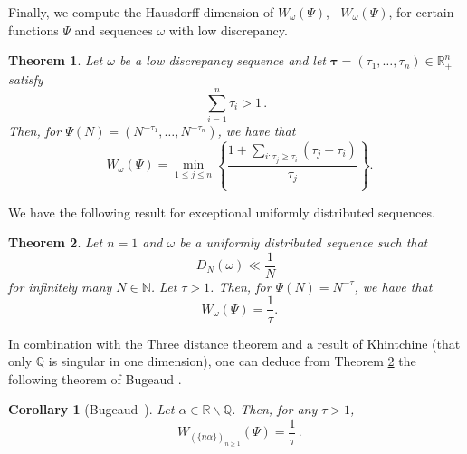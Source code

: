 \documentclass{amsart}
\newtheorem*{corollary*}{Corollary}
\newtheorem{theorem}{Theorem}[section]
\theoremstyle{definition}
\newcommand{\N}{\mathbb N}%
\newcommand{\Q}{\mathbb Q}
\newcommand{\R}{\mathbb R}
\newcommand{\0}{\mbf 0}%
\DeclareMathOperator{\dimh}{\dim_H}
\def\N{\mathbb N}
\def\Q{\mathbb Q}
\def\R{\mathbb R}
\begin{document}
Finally, we compute the Hausdorff dimension of $W_{\omega}(\Psi)$, $\dimh W_{\omega}(\Psi)$, for certain functions $\Psi$ and sequences $\omega$ with low discrepancy.
\begin{theorem}\label{Jarnik Besicovitch uniform}
    Let $\omega$ be a low discrepancy sequence and let $\boldsymbol{\tau}=(\tau_{1},\dots, \tau_{n})\in \R^{n}_{+}$ satisfy
\begin{equation*}
    \sum_{i=1}^{n}\tau_{i}>1\, .
\end{equation*}
Then, for $\Psi(N)=(N^{-\tau_{1}},\dots, N^{-\tau_{n}})$, we have that
\begin{equation*}
    \dimh W_{\omega}(\Psi) = \min_{1\leq j \leq n}\left\{ \frac{1+\sum_{i:\tau_{j}\geq \tau_{i}}(\tau_{j}-\tau_{i})}{\tau_{j}}\right\}.
\end{equation*}
\end{theorem}

We have the following result for exceptional uniformly distributed sequences.

\begin{theorem}\label{Jarnik Besicovitch uniform2}
    Let $n=1$ and $\omega$ be a uniformly distributed sequence such that 
    \begin{equation*}
        D_{N}(\omega)\ll \frac{1}{N}
    \end{equation*}
    for infinitely many $N\in\N$. Let $\tau>1$. Then, for $\Psi(N)=N^{-\tau}$, we have that
\begin{equation*}
    \dimh W_{\omega}(\Psi) = \frac{1}{\tau}.
\end{equation*}
\end{theorem}
In combination with the Three distance theorem and a result of Khintchine \cite[Satz 1]{Khin26} (that only $\Q$ is singular in one dimension), one can deduce from Theorem \ref{Jarnik Besicovitch uniform2} the following theorem of Bugeaud \cite[Theorem 1]{Bugeaud03}.
\begin{corollary*}[Bugeaud~\cite{Bugeaud03}]
Let $\alpha \in \R\backslash\Q$. Then, for any $\tau>1$,
\begin{equation*}
\dimh W_{(\{n\alpha\})_{n\geq 1}}(\Psi)=\frac{1}{\tau}\, .
\end{equation*}
\end{corollary*}
\end{document}
